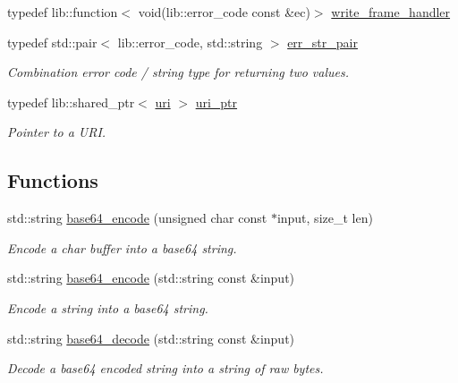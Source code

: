 \begin{DoxyCompactItemize}
\item 
typedef lib\+::function$<$ void(lib\+::error\+\_\+code const \&ec)$>$ \hyperlink{namespacewebsocketpp_aeb8dee2a5b6c4f1cac6755b206581216}{write\+\_\+frame\+\_\+handler}
\item 
typedef std\+::pair$<$ lib\+::error\+\_\+code, std\+::string $>$ \hyperlink{namespacewebsocketpp_abecf95d53c9387716b157daae84441f3}{err\+\_\+str\+\_\+pair}
\begin{DoxyCompactList}\small\item\em Combination error code / string type for returning two values. \end{DoxyCompactList}\item 
typedef lib\+::shared\+\_\+ptr$<$ \hyperlink{classwebsocketpp_1_1uri}{uri} $>$ \hyperlink{namespacewebsocketpp_aae370ea5ac83a8ece7712cb39fc23f5b}{uri\+\_\+ptr}
\begin{DoxyCompactList}\small\item\em Pointer to a U\+R\+I. \end{DoxyCompactList}\end{DoxyCompactItemize}
\subsection*{Functions}
\begin{DoxyCompactItemize}
\item 
std\+::string \hyperlink{namespacewebsocketpp_aff36d40583424a2c879df02219133af8}{base64\+\_\+encode} (unsigned char const $\ast$input, size\+\_\+t len)
\begin{DoxyCompactList}\small\item\em Encode a char buffer into a base64 string. \end{DoxyCompactList}\item 
std\+::string \hyperlink{namespacewebsocketpp_a3a167489f63491475d0069204edf71da}{base64\+\_\+encode} (std\+::string const \&input)
\begin{DoxyCompactList}\small\item\em Encode a string into a base64 string. \end{DoxyCompactList}\item 
std\+::string \hyperlink{namespacewebsocketpp_a1467174a88a2f4037c45dbeb9d57c481}{base64\+\_\+decode} (std\+::string const \&input)
\begin{DoxyCompactList}\small\item\em Decode a base64 encoded string into a string of raw bytes. \end{DoxyCompactList}\end{DoxyCompactItemize}


